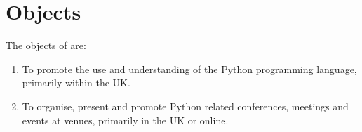 \section{Objects}\label{sec:objects}
The objects of \shortname{} are:
\begin{enumerate}
    \item To promote the use and understanding of the Python programming language, primarily within the UK\@.
    \item To organise, present and promote Python related conferences, meetings and events at venues, primarily in the UK or online\@.
\end{enumerate}
